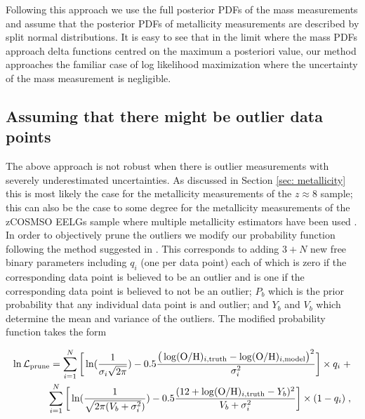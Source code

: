 \documentclass[twocolumn]{aastex631}
\begin{document}
\noindent
Following this approach we use the full posterior PDFs of the mass measurements and assume that the posterior PDFs of metallicity measurements are described by split normal distributions. It is easy to see that in the limit where the mass PDFs approach delta functions centred on the maximum a posteriori value, our method approaches the familiar case of log likelihood maximization where the uncertainty of the mass measurement is negligible. 

\subsection{Assuming that there might be outlier data points} \label{app: outlier}

The above approach is not robust when there is outlier measurements with severely underestimated uncertainties. As discussed in Section \ref{sec: metallicity} this is most likely the case for the metallicity measurements of the $z \approx 8$ sample; this can also be the case to some degree for the metallicity measurements of the zCOSMSO EELGs sample where multiple metallicity estimators have been used \citep[see][]{eelgs}. 
In order to objectively prune the outliers we modify our probability function following the method suggested in \cite{hogg+2010}. This corresponds to adding $3 + N$ new free binary parameters including $q_i$ (one per data point) each of which is zero if the corresponding data point is believed to be an outlier and is one if the corresponding data point is believed to not be an outlier; $P_b$ which is the prior probability that any individual data point is and outlier; and $Y_b$ and $V_b$ which determine the mean and variance of the outliers. 
The modified probability function takes the form 

\begin{equation}
\begin{split}
    \ln\mathcal{L}_{\textnormal{prune}} = \sum_{i=1}^{N} \bigg[ \ln( \frac{1}{\sigma_i \sqrt{2\pi}} ) - 0.5 \frac{\big(\log(\textnormal{O/H})_{i, \textnormal{\scriptsize truth}} - \log(\textnormal{O/H})_{i, \textnormal{\scriptsize model}}\big)^2}{\sigma_i^2} \bigg] \times q_i \; + 
    \\
    \sum_{i=1}^N \bigg[\ln(\frac{1}{\sqrt{2\pi (V_b + \sigma_i^2})}) - 0.5 \frac{(12 + \log(\textnormal{O/H})_{i, \textnormal{\scriptsize truth}} - Y_b)^2}{V_b + \sigma_i^2} \bigg] \times (1-q_i) \;,
\end{split}
\end{equation}
\end{document}
